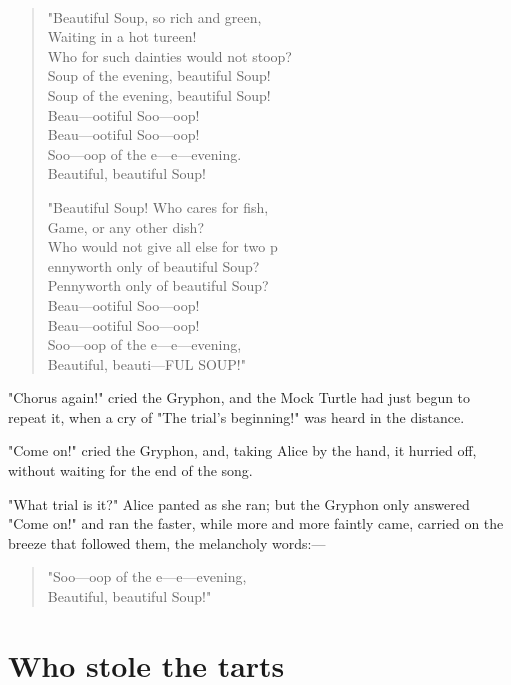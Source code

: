 ​\begin{quote}
"Beautiful Soup, so rich and green,\\
Waiting in a hot tureen!\\
Who for such dainties would not stoop?\\
Soup of the evening, beautiful Soup!\\
Soup of the evening, beautiful Soup!\\
⁠Beau—ootiful Soo—oop!\\
⁠Beau—ootiful Soo—oop!\\
Soo—oop of the e—e—evening.\\
⁠Beautiful, beautiful Soup!

"Beautiful Soup! Who cares for fish,\\
Game, or any other dish?\\
Who would not give all else for two p\\
ennyworth only of beautiful Soup?\\
Pennyworth only of beautiful Soup?\\
⁠Beau—ootiful Soo—oop!\\
⁠Beau—ootiful Soo—oop!\\
Soo—oop of the e—e—evening,\\
⁠Beautiful, beauti—FUL SOUP!"
\end{quote}

"Chorus again!" cried the Gryphon, and the Mock Turtle had just begun to repeat it, when ​a cry of "The trial's beginning!" was heard in the distance.

"Come on!" cried the Gryphon, and, taking Alice by the hand, it hurried off, without waiting for the end of the song.

"What trial is it?" Alice panted as she ran; but the Gryphon only answered "Come on!" and ran the faster, while more and more faintly came, carried on the breeze that followed them, the melancholy words:—

\begin{quote}
"Soo—oop of the e—e—evening,\\
⁠Beautiful, beautiful Soup!"
\end{quote}

\quebra\chapter*{Who stole the tarts}


